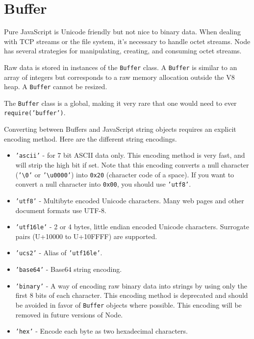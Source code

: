 \section{Buffer}

\begin{Shaded}
\begin{Highlighting}[]
\NormalTok{: } 
\end{Highlighting}
\end{Shaded}

Pure JavaScript is Unicode friendly but not nice to binary data. When
dealing with TCP streams or the file system, it's necessary to handle
octet streams. Node has several strategies for manipulating, creating,
and consuming octet streams.

Raw data is stored in instances of the \texttt{Buffer} class. A
\texttt{Buffer} is similar to an array of integers but corresponds to a
raw memory allocation outside the V8 heap. A \texttt{Buffer} cannot be
resized.

The \texttt{Buffer} class is a global, making it very rare that one
would need to ever \texttt{require('buffer')}.

Converting between Buffers and JavaScript string objects requires an
explicit encoding method. Here are the different string encodings.

\begin{itemize}
\item
  \texttt{'ascii'} - for 7 bit ASCII data only. This encoding method is
  very fast, and will strip the high bit if set. Note that this encoding
  converts a null character (\texttt{'\textbackslash{}0'} or
  \texttt{'\textbackslash{}u0000'}) into \texttt{0x20} (character code
  of a space). If you want to convert a null character into
  \texttt{0x00}, you should use \texttt{'utf8'}.
\item
  \texttt{'utf8'} - Multibyte encoded Unicode characters. Many web pages
  and other document formats use UTF-8.
\item
  \texttt{'utf16le'} - 2 or 4 bytes, little endian encoded Unicode
  characters. Surrogate pairs (U+10000 to U+10FFFF) are supported.
\item
  \texttt{'ucs2'} - Alias of \texttt{'utf16le'}.
\item
  \texttt{'base64'} - Base64 string encoding.
\item
  \texttt{'binary'} - A way of encoding raw binary data into strings by
  using only the first 8 bits of each character. This encoding method is
  deprecated and should be avoided in favor of \texttt{Buffer} objects
  where possible. This encoding will be removed in future versions of
  Node.
\item
  \texttt{'hex'} - Encode each byte as two hexadecimal characters.
\end{itemize}

